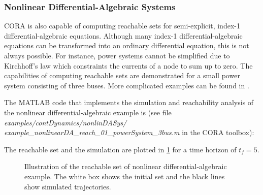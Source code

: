 \subsubsection{Nonlinear Differential-Algebraic Systems}

CORA is also capable of computing reachable sets for semi-explicit, index-1 differential-algebraic equations. Although many index-1 differential-algebraic equations can be transformed into an ordinary differential equation, this is not always possible. For instance, power systems cannot be simplified due to Kirchhoff's law which constraints the currents of a node to sum up to zero. The capabilities of computing reachable sets are demonstrated for a small power system consisting of three buses. More complicated examples can be found in \cite{Althoff2012c,Althoff2014a,Althoff2014c}.

The MATLAB code that implements the simulation and reachability analysis of the nonlinear differential-algebraic example is (see file \textit{examples/contDynamics/nonlinDASys/}\\ \textit{example\_nonlinearDA\_reach\_01\_powerSystem\_3bus.m} in the CORA toolbox):
    {\small
}

The reachable set and the simulation are plotted in \cref{fig:example_nonlinearDA_reach_01_powerSystem_3bus} for a time horizon of $t_f = 5$.
\begin{figure}[htb]
    \centering
    \footnotesize
    \caption{Illustration of the reachable set of nonlinear differential-algebraic example. The white box shows the initial set and the black lines show simulated trajectories.}
    \label{fig:example_nonlinearDA_reach_01_powerSystem_3bus}
\end{figure}
